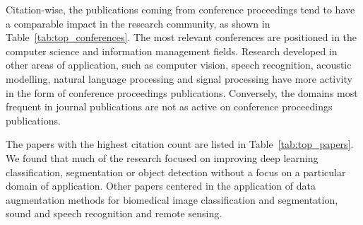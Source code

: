 \documentclass[parskip=full]{scrartcl}
\begin{document}
Citation-wise, the publications coming from conference proceedings tend to
have a comparable impact in the research community, as shown in
Table~\ref{tab:top_conferences}. The most relevant conferences are positioned
in the computer science and information management fields. Research developed
in other areas of application, such as computer vision, speech recognition,
acoustic modelling, natural language processing and signal processing have
more activity in the form of conference proceedings publications. Conversely,
the domains most frequent in journal publications are not as active on
conference proceedings publications.

\begin{table}[H]
    \centering
    \vspace{.2cm}
    \caption{\label{tab:top_conferences}
        Top conferences focusing on data augmentation techniques, sorted by
        citations per document.
    }
\end{table}

The papers with the highest citation count are listed in
Table~\ref{tab:top_papers}. 
We found that much of the research focused on improving deep learning
classification, segmentation or object detection without a focus on a
particular domain of application. Other papers centered in the application of
data augmentation methods for biomedical image classification and
segmentation, sound and speech recognition and remote sensing. 

\begin{table}[H]
    \centering
    \vspace{.2cm}
    \caption{\label{tab:top_papers}
        Top papers using data augmentation techniques, sorted by citation
        count.
    }
\end{table}
\end{document}
